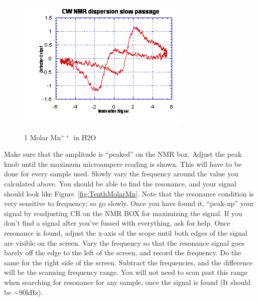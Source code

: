 \documentclass{../lab}
\begin{document}
\begin{enumerate}
\begin{figure}[h]
    \begin{minipage}[t]{0.32\textwidth}
        \href{http://experimentationlab.berkeley.edu/sites/default/files/images/NMR23.gif}{\includegraphics[width=\linewidth,keepaspectratio]{images/NMR23.png}}
        \caption{1 Molar Mn$^{++}$ in H2O}
        \label{fig:onemolar}
    \end{minipage}
    \end{figure}

\newpage

    Make sure that the amplitude is ``peaked'' on the NMR box. Adjust the peak knob until the maximum microampere reading is shown. This will have to be done for every sample used. Slowly vary the frequency around the value you calculated above. You should be able to find the resonance, and your signal should look like Figure~\ref{fig:TenthMolarMn}. Note that the resonance condition is very sensitive to frequency; so go slowly. Once you have found it, ``peak-up'' your signal by readjusting CR on the NMR BOX for maximizing the signal. If you don't find a signal after you've fussed with everything, ask for help. Once resonance is found, adjust the x-axis of the scope until both edges of the signal are visible on the screen. Vary the frequency so that the resonance signal goes barely off the edge to the left of the screen, and record the frequency. Do the same for the right side of the screen. Subtract the frequencies, and the difference will be the scanning frequency range. You will not need to scan past this range when searching for resonance for any sample, once the signal is found (It should be $\sim$90kHz).
    

\end{enumerate}
\end{document}

